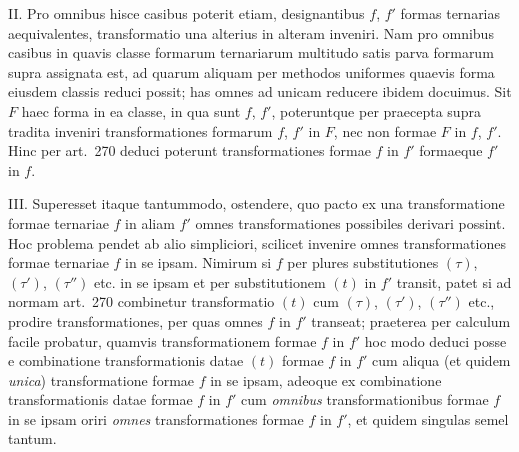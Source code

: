 II. Pro omnibus hisce casibus poterit etiam, designantibus $f$, $f'$ formas ternarias aequivalentes, transformatio una alterius in alteram inveniri. Nam pro omnibus casibus in quavis classe formarum ternariarum multitudo satis parva formarum supra assignata est, ad quarum aliquam per methodos uniformes quaevis forma eiusdem classis reduci possit; has omnes ad unicam reducere ibidem docuimus. Sit $F$ haec forma in ea classe, in qua sunt $f$, $f'$, poteruntque per praecepta supra tradita inveniri transformationes formarum $f$, $f'$ in $F$, nec non formae $F$ in $f$, $f'$. Hinc per art.~270 deduci poterunt transformationes formae $f$ in $f'$ formaeque $f'$ in $f$.

III. Superesset itaque tantummodo, ostendere, quo pacto ex una transformatione formae ternariae $f$ in aliam $f'$ omnes transformationes possibiles derivari possint. Hoc problema pendet ab alio simpliciori, scilicet invenire omnes transformationes formae ternariae $f$ in se ipsam. Nimirum si $f$ per plures substitutiones $(\tau)$, $(\tau')$, $(\tau'')$ etc. in se ipsam et per substitutionem $(t)$ in $f'$ transit, patet si ad normam art.~270 combinetur transformatio $(t)$ cum $(\tau)$, $(\tau')$, $(\tau'')$ etc., prodire transformationes, per quas omnes $f$ in $f'$ transeat; praeterea per calculum facile probatur, quamvis transformationem formae $f$ in $f'$ hoc modo deduci posse e combinatione transformationis datae $(t)$ formae $f$ in $f'$ cum aliqua (et quidem
\textit{unica}) transformatione formae $f$ in se ipsam, adeoque ex combinatione transformationis datae formae $f$ in $f'$ cum \textit{omnibus} transformationibus formae $f$ in se ipsam oriri \textit{omnes} transformationes formae $f$ in $f'$, et quidem singulas semel tantum.

